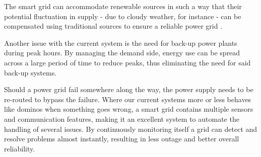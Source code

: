 The smart grid can accommodate renewable sources in such a way that their potential fluctuation in supply - due to cloudy weather, for instance - can be compensated using traditional sources to ensure a reliable power grid . 

Another issue with the current system is the need for back-up power plants during peak hours. By managing the demand side, energy use can be spread across a large period of time to reduce peaks, thus eliminating the need for said back-up systems. 

Should a power grid fail somewhere along the way, the power supply needs to be re-routed to bypass the failure. Where our current systems more or less behaves like dominos when something goes wrong, a smart grid contains multiple sensors and communication features, making it an excellent system to automate the handling of several issues. By continuously monitoring itself a grid can detect and resolve problems almost instantly, resulting in less outage and better overall reliability.



